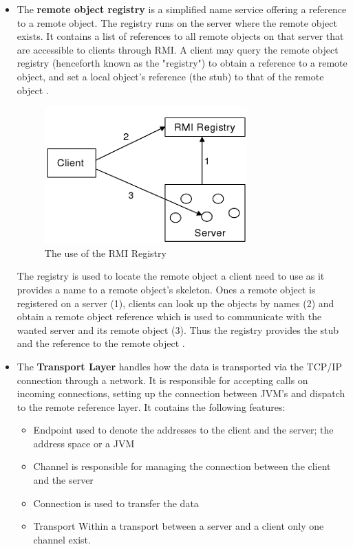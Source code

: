 \documentclass[Main]{subfiles}
\begin{document}
\begin{itemize}
\item The \textbf{remote object registry} is a simplified name service offering a reference to a remote object. The registry runs on the server where the remote object exists. It contains a list of references to all remote objects on that server that are accessible to clients through RMI. A client may query the remote object registry (henceforth known as the "registry") to obtain a reference to a remote object, and set a local object's reference (the stub) to that of the remote object \cite{HowRMI}. 
\begin{figure}[H]
\centering
\includegraphics[scale=0.8]{Figurer/RMI-registry.png}
\caption{The use of the RMI Registry \cite{RMI-slides}}
\end{figure}
The registry is used to locate the remote object a client need to use as it provides a name to a remote object's skeleton. Ones a remote object is registered on a server (1), clients can look up the objects by names (2) and obtain a remote object reference which is used to communicate with the wanted server and its remote object (3). Thus the registry provides the stub and the reference to the remote object \cite{Getting-started}.

\item The \textbf{Transport Layer} handles how the data is transported via the TCP/IP connection through a network. It is responsible for accepting calls on incoming connections, setting up the connection between JVM's and dispatch to the remote reference layer. It contains the following features:
\begin{itemize}
\item Endpoint used to denote the addresses to the client and the server; the address space or a JVM
\item Channel is responsible for managing the connection between the client and the server
\item Connection is used to transfer the data
\item Transport Within a transport between a server and a client only one channel exist.
\end{itemize}

\setlength\parindent{300pt}\cite{RMI-slides}

\end{itemize}
\end{document}
